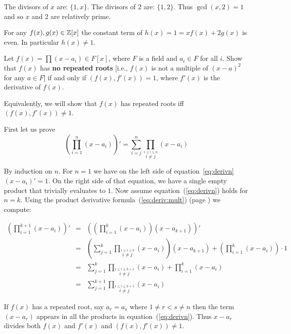\begin{myenumerate}
The divisors of $x$ are: \(\{1,x\}\).
The divisors of $2$ are: \(\{1,2\}\).
Thus \(\gcd(x,2)=1\) and so $x$ and $2$ are relatively prime.

For any  \(f(x),g(x)\in \mathbb{Z}[x]\)
the constant term of \(h(x)=1=xf(x)+2g(x)\) is even.
In particular \(h(x)\neq 1\).

\item
\begin{excopy}
Let \(f(x)=\prod(x-a_i)\in F[x]\), where $F$ is a field and
\(a_i\in F\) for all $i$.
Show that \(f(x)\) has
\textbf{no repeated roots} [i.e., \(f(x)\) is not a multiple of \((x-a)^2\)
for any \(a\in F\)] if and only if \((f(x),f'(x))=1\),
where \(f'(x)\) is the derivative of \(f(x)\).
\end{excopy}

Equivalently, we will show that
\(f(x)\) has repeated roots iff \((f(x),f'(x))\neq1\).

First let us prove
\begin{equation} \label{eq:derivn}
\left(\prod_{i=1}^n(x-a_i)\right)' =
  \sum_{i=j}^n \prod_{\overset{1\leq i\leq n}{i\neq j}}(x-a_i)
\end{equation}

By induction on $n$. For \(n=1\) we have on the left side
of equation~\ref{eq:derivn} \((x-a_i)'=1\).
On the right side of that equation, we have a single empty product
that trivially evaluates to $1$.
Now assume equation~(\ref{eq:derivn}) holds for \(n=k\).
Using the
product derivative formula~(\ref{eq:deriv:mult})
(page \pageref{eq:deriv:mult}) we compute:

\begin{eqnarray*}
\left(\prod_{i=1}^{k+1}(x-a_i)\right)'
 & = & \left(\left(\prod_{i=1}^{k}(x-a_i)\right)(x-a_{k+1})\right)' \\
 & = & \left(\sum_{j=1}^k \prod_{\overset{1\leq i\leq k}{i\neq j}}(x-a_i)\right)
       (x-a_{k+1}) +
        \left(\prod_{i=1}^{k}(x-a_i)\right)\cdot 1 \\
 & = & \sum_{j=1}^k \prod_{\overset{1\leq i\leq k+1}{i\neq j}}(x-a_i) +
        \prod_{i=1}^k(x-a_i) \\
 & = & \sum_{j=1}^{k+1} \prod_{\overset{1\leq i\leq k+1}{i\neq j}}(x-a_i)
\end{eqnarray*}

If \(f(x)\) has a repeated root, say \(a_r=a_s\) where
\(1\neq r < s\neq n\) then the term \((x-a_r)\) appears in
all the products in equation~(\ref{eq:derivn}).
Thus \(x-a_r\) divides both \(f(x)\) and \(f'(x)\) and \((f(x),f'(x))\neq 1\).


\end{myenumerate}
